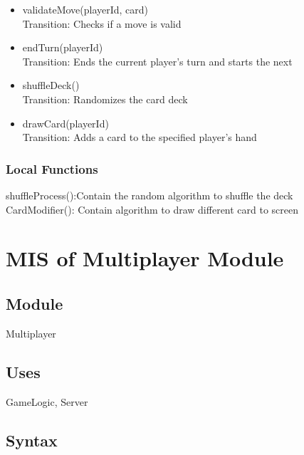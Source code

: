 \documentclass[12pt, titlepage]{article}
\begin{document}
\begin{itemize}
\item validateMove(playerId, card)\\
Transition: Checks if a move is valid

\item endTurn(playerId)\\
Transition: Ends the current player's turn and starts the next

\item shuffleDeck()\\
Transition: Randomizes the card deck

\item drawCard(playerId)\\
Transition: Adds a card to the specified player’s hand

\end{itemize}


\subsubsection{Local Functions}
\hspace{1.5em}shuffleProcess():Contain the random algorithm to shuffle the deck\\
\indent CardModifier(): Contain algorithm to draw different card to screen

\section{MIS of Multiplayer Module} \label{Module} 



\subsection{Module}
\hspace{1.5em}Multiplayer

\subsection{Uses}
\hspace{1.5em}GameLogic, Server

\subsection{Syntax}
\end{document}
